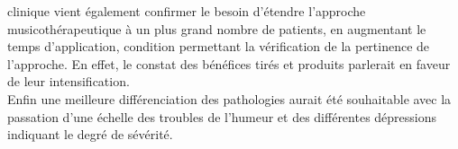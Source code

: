 clinique vient également 
confirmer le besoin d'étendre l'approche musicothérapeutique à
un plus grand nombre de patients, en augmentant le temps
d'application, condition permettant la vérification de la
pertinence de l'approche. En effet, le constat des bénéfices
tirés et
produits parlerait en faveur de leur intensification.
 \\
Enfin une meilleure différenciation des pathologies aurait été souhaitable avec la 
passation d'une échelle des troubles de l'humeur et des différentes
dépressions indiquant le degré de sévérité.
